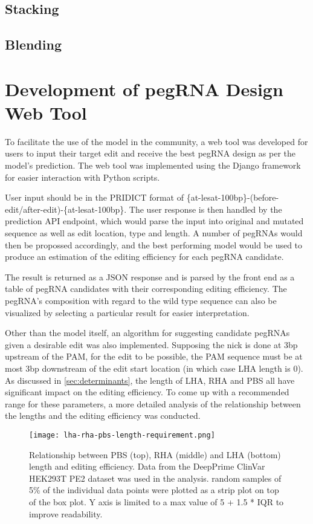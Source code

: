 \subsection{Stacking}


\subsection{Blending}


\section{Development of pegRNA Design Web Tool}

To facilitate the use of the model in the community, a web tool was developed for users to input their target edit and receive the best pegRNA design as per the model's prediction. The web tool was implemented using the Django framework for easier interaction with Python scripts. 

User input should be in the PRIDICT format of \{at-lesat-100bp\}-(before-edit/after-edit)-\{at-lesat-100bp\}. The user response is then handled by the prediction API endpoint, which would parse the input into original and mutated sequence as well as edit location, type and length. A number of pegRNAs would then be propossed accordingly, and the best performing model would be used to produce an estimation of the editing efficiency for each pegRNA candidate. 

The result is returned as a JSON response and is parsed by the front end as a table of pegRNA candidates with their corresponding editing efficiency. The pegRNA's composition with regard to the wild type sequence can also be visualized by selecting a particular result for easier interpretation.

Other than the model itself, an algorithm for suggesting candidate pegRNAs given a desirable edit was also implemented. Supposing the nick is done at 3bp upstream of the PAM, for the edit to be possible, the PAM sequence must be at most 3bp downstream of the edit start location (in which case LHA length is 0). As discussed in \autoref{sec:determinants}, the length of LHA, RHA and PBS all have significant impact on the editing efficiency. To come up with a recommended range for these parameters, a more detailed analysis of the relationship between the lengths and the editing efficiency was conducted.

\begin{figure}
    \texttt{[image: lha-rha-pbs-length-requirement.png]}
    \caption[Relationship between LHA, RHA and PBS length and editing efficiency]{Relationship between PBS (top), RHA (middle) and LHA (bottom) length and editing efficiency. Data from the DeepPrime ClinVar HEK293T PE2 dataset was used in the analysis. random samples of 5\% of the individual data points were plotted as a strip plot on top of the box plot. Y axis is limited to a max value of 5 + 1.5 * IQR to improve readability.}
    \label{fig:lha-rha-pbs-length}
\end{figure}


